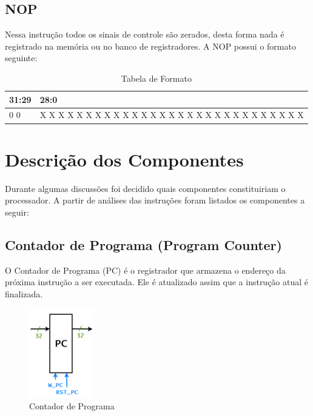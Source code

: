 \documentclass{report}
\begin{document}
\subsection{NOP}
Nessa instrução todos os sinais de controle são zerados, desta forma nada é registrado na memória ou no banco de registradores. A NOP possui o formato seguinte:

\FloatBarrier
\begin{table}[H]
  \begin{center}
    \begin{tabular}[pos]{|>{\centering\arraybackslash}m{37pt}|>{\centering\arraybackslash}m{365pt}|} \hline
    \cellcolor[gray]{0.9}\textbf{31:29} & \cellcolor[gray]{0.9}\textbf{28:0} \\ \hline
        0 0 0       &  X X X X X X X X X X X X X X X X X X X X X X X X X X X X X \\ \hline
    \end{tabular}
    \caption{Tabela de Formato}
  \end{center}
\end{table}  

\newpage
\section{Descrição dos Componentes}
Durante algumas discussões foi decidido quais  componentes constituiriam o processador. A partir de análises das instruções foram listados os componentes a seguir:
\subsection{Contador de Programa (Program Counter)}
O Contador de Programa (PC) é o registrador que armazena o endereço da próxima instrução a ser executada. Ele é atualizado assim que a instrução atual é finalizada.
\begin{figure}[H]
\centering
\includegraphics[width=0.25\textwidth]{./pictures/PC.PNG}
\caption{Contador de Programa}
\end{figure}
\end{document}
